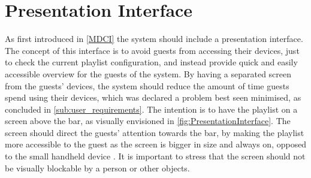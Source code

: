 \section{Presentation Interface}
As first introduced in \cref{MDCI} the system should include a presentation interface. The concept of this interface is to avoid guests from accessing their devices, just to check the current playlist configuration, and instead provide quick and easily accessible overview for the guests of the system. By having a separated screen from the guests' devices, the system should reduce the amount of time guests spend using their devices, which was declared a problem best seen minimised, as concluded in \cref{sub:user_requirements}. The intention is to have the playlist on a screen above the bar, as visually envisioned in \cref{fig:PresentationInterface}. The screen should direct the guests' attention towards the bar, by making the playlist more accessible to the guest as the screen is bigger in size and always on, opposed to the small handheld device \cite{DEB}. It is important to stress that the screen should not be visually blockable by a person or other objects.

